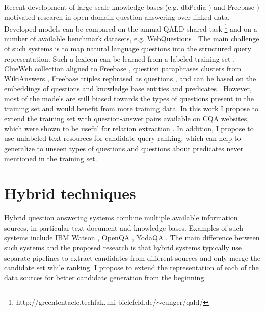 Recent development of large scale knowledge bases (e.g. dbPedia \cite{auer2007dbpedia}) and Freebase \cite{Bollacker:2008:FCC:1376616.1376746}) motivated research in open domain question answering over linked data.
Developed models can be compared on the annual QALD shared task \footnote{http://greententacle.techfak.uni-bielefeld.de/$\sim$cunger/qald/} and on a number of available benchmark datasets, e.g. WebQuestions \cite{BerantCFL13:sempre}.
The main challenge of such systems is to map natural language questions into the structured query representation.
Such a lexicon can be learned from a labeled training set \cite{BerantCFL13:sempre},  ClueWeb collection aligned to Freebase \cite{ReddyLS14,YaoD14}, question paraphrases clusters from WikiAnswers \cite{BerantL14:parasempre}, Freebase triples rephrased as questions \cite{BordesCW14:emnlp}, and can be based on the embeddings of questions and knowledge base entities and predicates \cite{BordesCW14:emnlp,yih:ACL:2015:STAGG}.
However, most of the models are still biased towards the types of questions present in the training set and would benefit from more training data.
In this work I propose to extend the training set with question-answer pairs available on CQA websites, which were shown to be useful for relation extraction \cite{SavenkovLDA15}.
In addition, I propose to use unlabeled text resources for candidate query ranking, which can help to generalize to unseen types of questions and questions about predicates never mentioned in the training set.

\section{Hybrid techniques}

Hybrid question answering systems combine multiple available information sources, in particular text document and knowledge bases.
Examples of such systems include IBM Watson \cite{Ferrucci10:DeepQA}, OpenQA \cite{Fader:2014:OQA:2623330.2623677}, YodaQA \cite{baudivs2015modeling}.
The main difference between such systems and the proposed research is that hybrid systems typically use separate pipelines to extract candidates from different sources and only merge the candidate set while ranking.
I propose to extend the representation of each of the data sources for better candidate generation from the beginning.